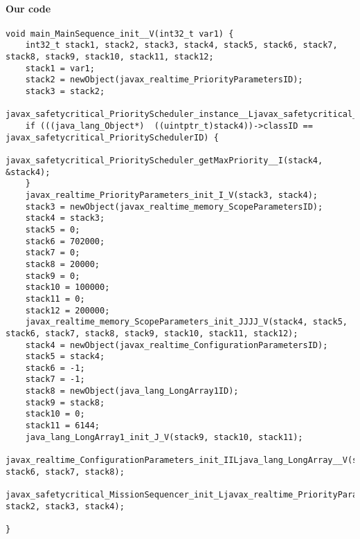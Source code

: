 \paragraph{Our code}\hfill
\begin{lstlisting}[firstnumber=1422]
void main_MainSequence_init__V(int32_t var1) {
	int32_t stack1, stack2, stack3, stack4, stack5, stack6, stack7, stack8, stack9, stack10, stack11, stack12;
	stack1 = var1;
	stack2 = newObject(javax_realtime_PriorityParametersID);
	stack3 = stack2;
	javax_safetycritical_PriorityScheduler_instance__Ljavax_safetycritical_PriorityScheduler_(&stack4);
	if (((java_lang_Object*)  ((uintptr_t)stack4))->classID == javax_safetycritical_PrioritySchedulerID) {
		javax_safetycritical_PriorityScheduler_getMaxPriority__I(stack4, &stack4);
	}
	javax_realtime_PriorityParameters_init_I_V(stack3, stack4);
	stack3 = newObject(javax_realtime_memory_ScopeParametersID);
	stack4 = stack3;
	stack5 = 0;
	stack6 = 702000;
	stack7 = 0;
	stack8 = 20000;
	stack9 = 0;
	stack10 = 100000;
	stack11 = 0;
	stack12 = 200000;
	javax_realtime_memory_ScopeParameters_init_JJJJ_V(stack4, stack5, stack6, stack7, stack8, stack9, stack10, stack11, stack12);
	stack4 = newObject(javax_realtime_ConfigurationParametersID);
	stack5 = stack4;
	stack6 = -1;
	stack7 = -1;
	stack8 = newObject(java_lang_LongArray1ID);
	stack9 = stack8;
	stack10 = 0;
	stack11 = 6144;
	java_lang_LongArray1_init_J_V(stack9, stack10, stack11);
	javax_realtime_ConfigurationParameters_init_IILjava_lang_LongArray__V(stack5, stack6, stack7, stack8);
	javax_safetycritical_MissionSequencer_init_Ljavax_realtime_PriorityParameters_Ljavax_realtime_memory_ScopeParameters_Ljavax_realtime_ConfigurationParameters__V(stack1, stack2, stack3, stack4);

}
\end{lstlisting}

